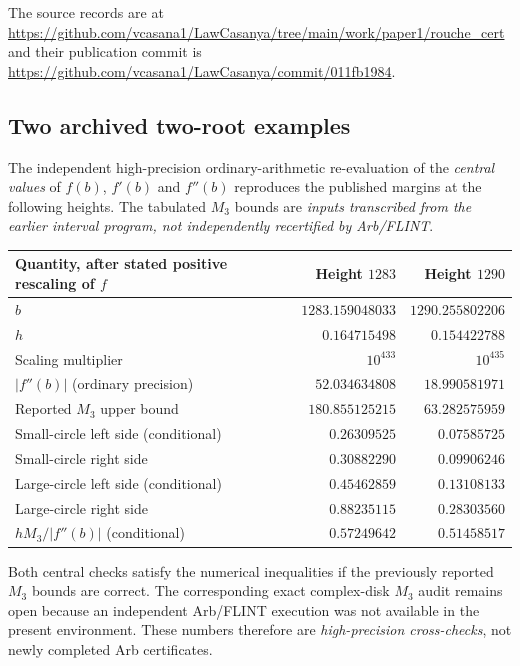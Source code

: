 \documentclass[11pt,reqno]{amsart}
\numberwithin{equation}{section}
\theoremstyle{definition}
\theoremstyle{remark}
\begin{document}
The source records are at
\url{https://github.com/vcasana1/LawCasanya/tree/main/work/paper1/rouche_cert}
and their publication commit is
\url{https://github.com/vcasana1/LawCasanya/commit/011fb1984}.

\subsection{Two archived two-root examples}\label{subsec:two-checks}
The independent high-precision ordinary-arithmetic re-evaluation of the \emph{central values} of $f(b)$, $f'(b)$ and $f''(b)$ reproduces the published margins at the following heights. The tabulated $M_3$ bounds are \emph{inputs transcribed from the earlier interval program, not independently recertified by Arb/FLINT}.
\begin{center}\small
\begin{tabular}{@{}lrr@{}}\toprule
Quantity, after stated positive rescaling of $f$ & Height $1283$ & Height $1290$\\\midrule
$b$ & $1283.159048033$ & $1290.255802206$\\
$h$ & $0.164715498$ & $0.154422788$\\
Scaling multiplier & $10^{433}$ & $10^{435}$\\
$|f''(b)|$ (ordinary precision) & $52.034634808$ & $18.990581971$\\
Reported $M_3$ upper bound & $180.855125215$ & $63.282575959$\\
Small-circle left side (conditional) & $0.26309525$ & $0.07585725$\\
Small-circle right side & $0.30882290$ & $0.09906246$\\
Large-circle left side (conditional) & $0.45462859$ & $0.13108133$\\
Large-circle right side & $0.88235115$ & $0.28303560$\\
$hM_3/|f''(b)|$ (conditional) & $0.57249642$ & $0.51458517$\\\bottomrule
\end{tabular}
\end{center}
Both central checks satisfy the numerical inequalities if the previously reported $M_3$ bounds are correct. The corresponding exact complex-disk $M_3$ audit remains open because an independent Arb/FLINT execution was not available in the present environment. These numbers therefore are \emph{high-precision cross-checks}, not newly completed Arb certificates.
\end{document}
